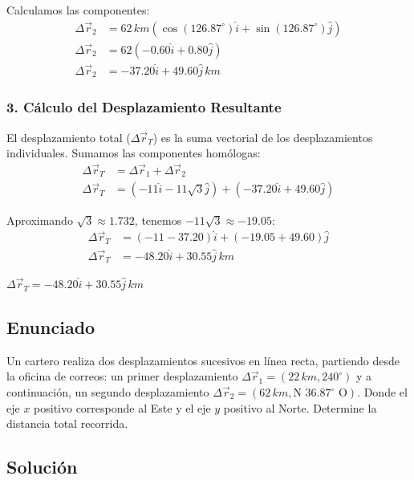 \documentclass[12pt, a4paper]{article}
\begin{document}
Calculamos las componentes:
\begin{align*}
    \Delta\vec{r}_2 &= 62 \, \si{km} (\cos(126.87^\circ) \hat{i} + \sin(126.87^\circ) \hat{j}) \\
    \Delta\vec{r}_2 &= 62 (-0.60 \hat{i} + 0.80 \hat{j}) \\
    \Delta\vec{r}_2 &= -37.20\hat{i} + 49.60\hat{j} \, \si{km}
\end{align*}

\subsubsection*{3. Cálculo del Desplazamiento Resultante}
El desplazamiento total ($\Delta\vec{r}_T$) es la suma vectorial de los desplazamientos individuales. Sumamos las componentes homólogas:
\begin{align*}
    \Delta\vec{r}_T &= \Delta\vec{r}_1 + \Delta\vec{r}_2 \\
    \Delta\vec{r}_T &= (-11\hat{i} - 11\sqrt{3}\hat{j}) + (-37.20\hat{i} + 49.60\hat{j})
\end{align*}

Aproximando $\sqrt{3} \approx 1.732$, tenemos $-11\sqrt{3} \approx -19.05$:
\begin{align*}
    \Delta\vec{r}_T &= (-11 - 37.20)\hat{i} + (-19.05 + 49.60)\hat{j} \\
    \Delta\vec{r}_T &= -48.20\hat{i} + 30.55\hat{j} \, \si{km}
\end{align*}

\begin{tcolorbox}[colback=green!5!white, colframe=green!50!black, title=Respuesta Final]
\centering \Large $\Delta\vec{r}_T = -48.20\hat{i} + 30.55\hat{j} \, \si{km}$
\end{tcolorbox}

\newpage

\subsection*{Enunciado}
Un cartero realiza dos desplazamientos sucesivos en línea recta, partiendo desde la oficina de correos: un primer desplazamiento $\Delta\vec{r}_1 = (22 \, \si{km}, 240^\circ)$ y a continuación, un segundo desplazamiento $\Delta\vec{r}_2 = (62 \, \si{km}, \text{N } 36.87^\circ \text{ O})$. Donde el eje $x$ positivo corresponde al Este y el eje $y$ positivo al Norte. Determine la distancia total recorrida.

\subsection*{Solución}
\end{document}
